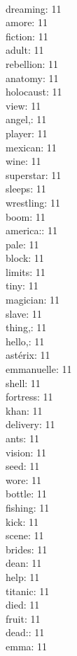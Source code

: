 \begin{multicols}{6}
  \\ dreaming: 11
  \\ amore: 11
  \\ fiction: 11
  \\ adult: 11
  \\ rebellion: 11
  \\ anatomy: 11
  \\ holocaust: 11
  \\ view: 11
  \\ angel,: 11
  \\ player: 11
  \\ mexican: 11
  \\ wine: 11
  \\ superstar: 11
  \\ sleeps: 11
  \\ wrestling: 11
  \\ boom: 11
  \\ america:: 11
  \\ pale: 11
  \\ block: 11
  \\ limits: 11
  \\ tiny: 11
  \\ magician: 11
  \\ slave: 11
  \\ thing,: 11
  \\ hello,: 11
  \\ astérix: 11
  \\ emmanuelle: 11
  \\ shell: 11
  \\ fortress: 11
  \\ khan: 11
  \\ delivery: 11
  \\ ants: 11
  \\ vision: 11
  \\ seed: 11
  \\ wore: 11
  \\ bottle: 11
  \\ fishing: 11
  \\ kick: 11
  \\ scene: 11
  \\ brides: 11
  \\ dean: 11
  \\ help: 11
  \\ titanic: 11
  \\ died: 11
  \\ fruit: 11
  \\ dead:: 11
  \\ emma: 11

\end{multicols}
